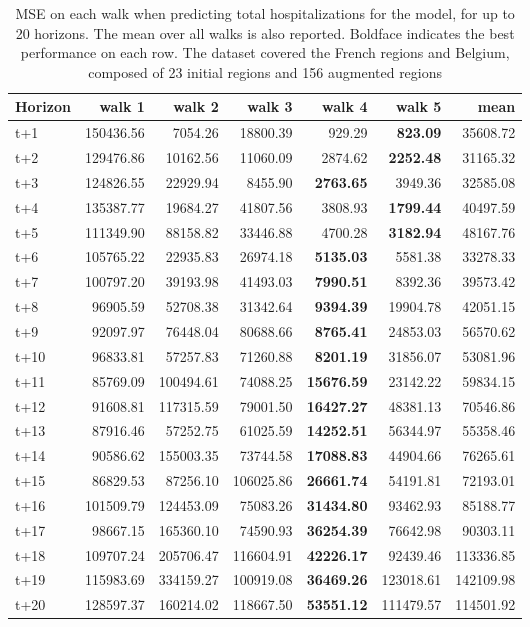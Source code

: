 \begin{table}[H]
\centering
\caption{MSE on each walk when predicting total hospitalizations for the model, for up to 20 horizons. The mean over all walks is also reported. Boldface indicates the best performance on each row. The dataset covered the French regions and Belgium, composed of 23 initial regions and 156 augmented regions }
\label{tab:MSE_walk_dense_model}
\begin{tabular}{lrrrrrr}
\toprule
Horizon &    walk 1 &    walk 2 &    walk 3 &   walk 4 &    walk 5 &      mean \\
\midrule
t+1  & 150436.56  & 7054.26  & 18800.39  & 929.29  & \textbf{823.09}  & 35608.72  \\
t+2  & 129476.86  & 10162.56  & 11060.09  & 2874.62  & \textbf{2252.48}  & 31165.32  \\
t+3  & 124826.55  & 22929.94  & 8455.90  & \textbf{2763.65}  & 3949.36  & 32585.08  \\
t+4  & 135387.77  & 19684.27  & 41807.56  & 3808.93  & \textbf{1799.44}  & 40497.59  \\
t+5  & 111349.90  & 88158.82  & 33446.88  & 4700.28  & \textbf{3182.94}  & 48167.76  \\
t+6  & 105765.22  & 22935.83  & 26974.18  & \textbf{5135.03}  & 5581.38  & 33278.33  \\
t+7  & 100797.20  & 39193.98  & 41493.03  & \textbf{7990.51}  & 8392.36  & 39573.42  \\
t+8  & 96905.59  & 52708.38  & 31342.64  & \textbf{9394.39}  & 19904.78  & 42051.15  \\
t+9  & 92097.97  & 76448.04  & 80688.66  & \textbf{8765.41}  & 24853.03  & 56570.62  \\
t+10  & 96833.81  & 57257.83  & 71260.88  & \textbf{8201.19}  & 31856.07  & 53081.96  \\
t+11  & 85769.09  & 100494.61  & 74088.25  & \textbf{15676.59}  & 23142.22  & 59834.15  \\
t+12  & 91608.81  & 117315.59  & 79001.50  & \textbf{16427.27}  & 48381.13  & 70546.86  \\
t+13  & 87916.46  & 57252.75  & 61025.59  & \textbf{14252.51}  & 56344.97  & 55358.46  \\
t+14  & 90586.62  & 155003.35  & 73744.58  & \textbf{17088.83}  & 44904.66  & 76265.61  \\
t+15  & 86829.53  & 87256.10  & 106025.86  & \textbf{26661.74}  & 54191.81  & 72193.01  \\
t+16  & 101509.79  & 124453.09  & 75083.26  & \textbf{31434.80}  & 93462.93  & 85188.77  \\
t+17  & 98667.15  & 165360.10  & 74590.93  & \textbf{36254.39}  & 76642.98  & 90303.11  \\
t+18  & 109707.24  & 205706.47  & 116604.91  & \textbf{42226.17}  & 92439.46  & 113336.85  \\
t+19  & 115983.69  & 334159.27  & 100919.08  & \textbf{36469.26}  & 123018.61  & 142109.98  \\
t+20  & 128597.37  & 160214.02  & 118667.50  & \textbf{53551.12}  & 111479.57  & 114501.92  \\

\bottomrule
\end{tabular}
\end{table}
